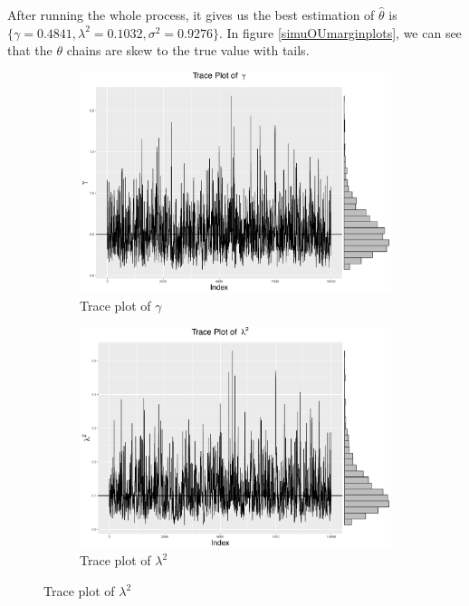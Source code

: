 After running the whole process, it gives us the best estimation of $\hat{\theta}$ is
$\{ \gamma=0.4841, \lambda^2=0.1032, \sigma^2=0.9276\}$. In figure \ref{simuOUmarginplots}, we can see that the $\theta$ chains are skew to the true value with tails.
\begin{figure}[h]
\centering
 \begin{subfigure}[b]{0.3\textwidth}
     \includegraphics[width=\textwidth]{Chapters/05MCMCOU/plots/simudataOUtracegam.pdf}
     \caption{Trace plot of $\gamma$}
\end{subfigure}
\begin{subfigure}[b]{0.3\textwidth}
    \includegraphics[width=\textwidth]{Chapters/05MCMCOU/plots/simudataOUtracelab2.pdf}
     \caption{Trace plot of $\lambda^2$}
\end{subfigure}

\end{figure}
